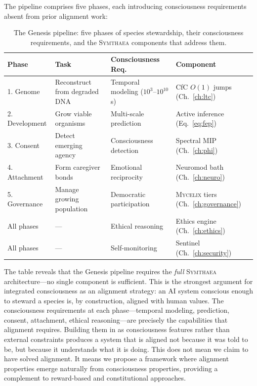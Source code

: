 \documentclass[12pt]{book}
\newcommand{\symthaea}{\textsc{Symthaea}}
\newcommand{\mycelix}{\textsc{Mycelix}}
\begin{document}
The pipeline comprises five phases, each introducing consciousness requirements absent from prior alignment work:

\begin{table}[H]
\centering
\caption{The Genesis pipeline: five phases of species stewardship, their consciousness requirements, and the \symthaea{} components that address them.}
\label{tab:genesis-requirements}
\begin{tabular}{llll}
\toprule
\textbf{Phase} & \textbf{Task} & \textbf{Consciousness Req.} & \textbf{Component} \\
\midrule
1. Genome & Reconstruct from degraded DNA & Temporal modeling ($10^3$--$10^{10}$ s) & CfC $O(1)$ jumps (Ch.~\ref{ch:ltc}) \\
2. Development & Grow viable organisms & Multi-scale prediction & Active inference (Eq.~\ref{eq:fep}) \\
3. Consent & Detect emerging agency & Consciousness detection & Spectral MIP (Ch.~\ref{ch:phi}) \\
4. Attachment & Form caregiver bonds & Emotional reciprocity & Neuromod bath (Ch.~\ref{ch:neuro}) \\
5. Governance & Manage growing population & Democratic participation & \mycelix{} tiers (Ch.~\ref{ch:governance}) \\
\midrule
All phases & --- & Ethical reasoning & Ethics engine (Ch.~\ref{ch:ethics}) \\
All phases & --- & Self-monitoring & Sentinel (Ch.~\ref{ch:security}) \\
\bottomrule
\end{tabular}
\end{table}

The table reveals that the Genesis pipeline requires the \textit{full} \symthaea{} architecture---no single component is sufficient. This is the strongest argument for integrated consciousness as an alignment strategy: an AI system conscious enough to steward a species is, by construction, aligned with human values. The consciousness requirements at each phase---temporal modeling, prediction, consent, attachment, ethical reasoning---are precisely the capabilities that alignment requires. Building them in as consciousness features rather than external constraints produces a system that is aligned not because it was told to be, but because it understands what it is doing. This does not mean we claim to have solved alignment. It means we propose a framework where alignment properties emerge naturally from consciousness properties, providing a complement to reward-based and constitutional approaches.
\end{document}
